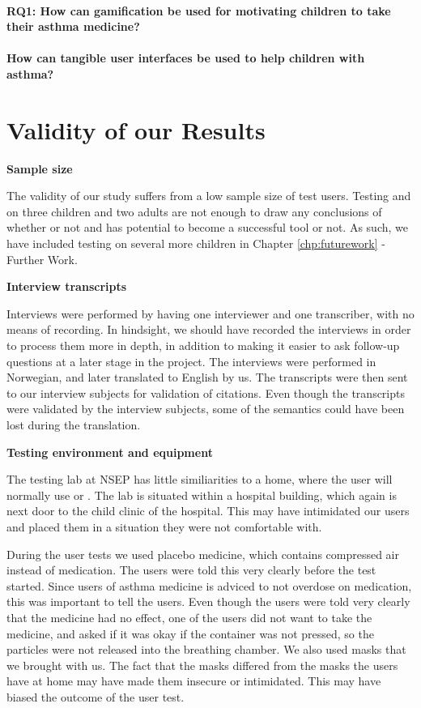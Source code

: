 \paragraph{RQ1: How can gamification be used for motivating children to take their asthma medicine?}



\paragraph{How can tangible user interfaces be used to help children with asthma?}


\section{Validity of our Results}
\label{sec:validity}

\textbf{Sample size}

The validity of our study suffers from a low sample size of test users. Testing \ab{} and \app{} on three children and two adults are not enough to draw any conclusions of whether or not \app{} and \ab{} has potential to become a successful tool or not. As such, we have included testing on several more children in Chapter \ref{chp:futurework} - Further Work.    

\textbf{Interview transcripts}

Interviews were performed by having one interviewer and one transcriber, with no means of recording. In hindsight, we should have recorded the interviews in order to process them more in depth, in addition to making it easier to ask follow-up questions at a later stage in the project. The interviews were performed in Norwegian, and later translated to English by us. The transcripts were then sent to our interview subjects for validation of citations. Even though the transcripts were validated by the interview subjects, some of the semantics could have been lost during the translation. 


\textbf{Testing environment and equipment}

The testing lab at NSEP has little similiarities to a home, where the user will normally use \ab{} or \app{}. The lab is situated within a hospital building, which again is next door to the child clinic of the hospital. This may have intimidated our users and placed them in a situation they were not comfortable with. 

During the user tests we used placebo medicine, which contains compressed air instead of medication. The users were told this very clearly before the test started. Since users of asthma medicine is adviced to not overdose on medication, this was important to tell the users. Even though the users were told very clearly that the medicine had no effect, one of the users did not want to take the medicine, and asked if it was okay if the container was not pressed, so the particles were not released into the breathing chamber. 
We also used masks that we brought with us. The fact that the masks differed from the masks the users have at home may have made them insecure or intimidated. This may have biased the outcome of the user test. 



